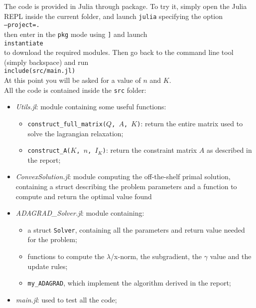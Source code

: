 \documentclass[notitlepage]{article}
\begin{document}
The code is provided in Julia through package. To try it, simply open the Julia REPL inside the current folder, and launch \texttt{julia} specifying the option\\[0.2ex]
\hspace*{0.5ex}\hspace{0.5ex}\hspace{0.5ex}\texttt{--project=.}\\[0.2ex]
then enter in the \texttt{pkg} mode using \texttt{]} and launch\\[0.2ex]
\hspace*{0.5ex}\hspace{0.5ex}\hspace{0.5ex}\texttt{instantiate}\\[0.2ex]
to download the required modules. Then go back to the command line tool (simply backspace) and run\\[0.2ex]
\hspace*{0.5ex}\hspace{0.5ex}\hspace{0.5ex}\texttt{include(src/main.jl)}\\[0.2ex]
At this point you will be asked for a value of $n$ and $K$.\\
All the code is contained inside the \texttt{src} folder:
\begin{itemize}
  \item \textit{Utils.jl}: module containing some useful functions:
  \begin{itemize}
    \item \texttt{construct\_full\_matrix($Q$, $A$, $K$)}: return the entire matrix used to solve the lagrangian relaxation;
    \item \texttt{construct\_A($K$, $n$, $I_K$)}: return the constraint matrix $A$ as described in the report;
  \end{itemize}
  \item \textit{ConvexSolution.jl}: module computing the off-the-shelf primal solution, containing a struct describing the problem parameters and a function to compute and return the optimal value found
  \item \textit{ADAGRAD\_Solver.jl}: module containing:
  \begin{itemize}
    \item a struct \texttt{Solver}, containing all the parameters and return value needed for the problem;
    \item functions to compute the $\lambda$/x-norm, the subgradient, the $\gamma$ value and the update rules;
    \item \texttt{my\_ADAGRAD}, which implement the algorithm derived in the report;
  \end{itemize}
  \item \textit{main.jl}: used to test all the code;
\end{itemize}
\end{document}
